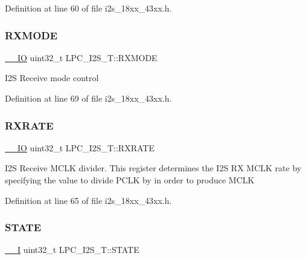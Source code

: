 Definition at line 60 of file i2s\+\_\+18xx\+\_\+43xx.\+h.

\mbox{\label{struct_l_p_c___i2_s___t_a257e2de4bfa371adba9eeb4c2e95fe09}} 
\subsubsection{\texorpdfstring{R\+X\+M\+O\+DE}{RXMODE}}
{\footnotesize\ttfamily \hyperlink{core__sc300_8h_aec43007d9998a0a0e01faede4133d6be}{\+\_\+\+\_\+\+IO} uint32\+\_\+t L\+P\+C\+\_\+\+I2\+S\+\_\+\+T\+::\+R\+X\+M\+O\+DE}

I2S Receive mode control 

Definition at line 69 of file i2s\+\_\+18xx\+\_\+43xx.\+h.

\mbox{\label{struct_l_p_c___i2_s___t_a03d51065fa11a182809e189b919b034a}} 
\subsubsection{\texorpdfstring{R\+X\+R\+A\+TE}{RXRATE}}
{\footnotesize\ttfamily \hyperlink{core__sc300_8h_aec43007d9998a0a0e01faede4133d6be}{\+\_\+\+\_\+\+IO} uint32\+\_\+t L\+P\+C\+\_\+\+I2\+S\+\_\+\+T\+::\+R\+X\+R\+A\+TE}

I2S Receive M\+C\+LK divider. This register determines the I2S RX M\+C\+LK rate by specifying the value to divide P\+C\+LK by in order to produce M\+C\+LK 

Definition at line 65 of file i2s\+\_\+18xx\+\_\+43xx.\+h.

\mbox{\label{struct_l_p_c___i2_s___t_a35299409c86d4860e936a7ff3e5603bf}} 
\subsubsection{\texorpdfstring{S\+T\+A\+TE}{STATE}}
{\footnotesize\ttfamily \hyperlink{core__sc300_8h_af63697ed9952cc71e1225efe205f6cd3}{\+\_\+\+\_\+I} uint32\+\_\+t L\+P\+C\+\_\+\+I2\+S\+\_\+\+T\+::\+S\+T\+A\+TE}

